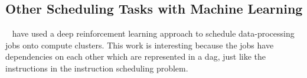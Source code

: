 \subsection{Other Scheduling Tasks with Machine Learning}
\citeauthor{mao2019learning}~\cite{mao2019learning} have used a deep reinforcement learning approach to schedule data-processing jobs onto compute clusters.
This work is interesting because the jobs have dependencies on each other which are represented in a \ac{dag}, just like the instructions in the instruction scheduling problem.







